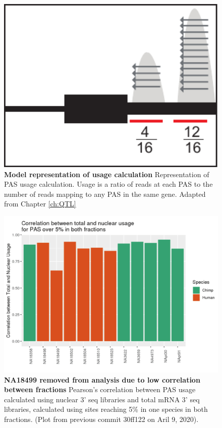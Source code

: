 \begin{figure}[!htb]
\centering
\includegraphics[width=5in]{img/ch03/Fig1-figSup2.pdf}
\caption[Model representation of usage calculation]{\textbf{Model representation of usage calculation} Representation of PAS usage calculation. Usage is a ratio of reads at each PAS to the number of reads mapping to any PAS in the same gene. Adapted from Chapter \ref{ch:QTL}}
\label{fig:ch03-UsageCalc}
\end{figure}
\clearpage

\begin{figure}[!htb]
\centering
\includegraphics[width=5in]{img/ch03/Fig1_figSup11.pdf}
\caption[NA18499 removed from analysis due to low correlation between fractions]{\textbf{NA18499 removed from analysis due to low correlation between fractions} Pearson's correlation between PAS usage calculated using nuclear 3' seq libraries and total mRNA 3' seq libraries, calculated using sites reaching 5\% in one species in both fractions. (Plot from previous commit 30ff122 on Aril 9, 2020). }
\label{fig:ch03-removeInd}
\end{figure}
\clearpage

